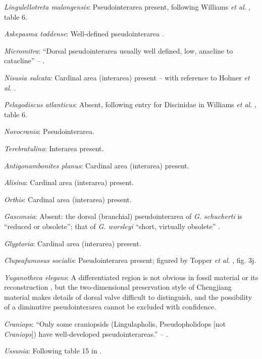 \documentclass[openany]{book}
\theoremstyle{definition}
\theoremstyle{definition}
\theoremstyle{definition}
\theoremstyle{remark}
\begin{document}
\emph{Lingulellotreta malongensis}: Pseudointerarea present, following
Williams \emph{et al}.
\citeyearpar{Williams2000BrachiopodaLinguliformea}, table 6.

\emph{Askepasma toddense}: Well-defined pseudointerarea
\citep[p153]{Williams2000BrachiopodaLinguliformea}.

\emph{Micromitra}: ``Dorsal pseudointerarea usually well defined, low,
anacline to catacline'' -- \citet{Williams2000BrachiopodaLinguliformea}.

\emph{Nisusia sulcata}: Cardinal area (interarea) present -- with
reference to Holmer \emph{et al}.
\citeyearpar{Holmer2018Evolutionarysignificance}.

\emph{Pelagodiscus atlanticus}: Absent, following entry for Discinidae
in Williams \emph{et al}.
\citeyearpar{Williams2000BrachiopodaLinguliformea}, table 6.

\emph{Novocrania}: Pseudointerarea.

\emph{Terebratulina}: Interarea present.

\emph{Antigonambonites planus}: Cardinal area (interarea) present.

\emph{Alisina}: Cardinal area (interarea) present.

\emph{Orthis}: Cardinal area (interarea) present.

\emph{Gasconsia}: Absent: the dorsal (branchial) pseudointerarea of
\emph{G. schucherti} is ``reduced or obsolete''; that of \emph{G.
worsleyi} ``short, virtually obsolete'' \citep{Hanken1985Thetaxonomy}.

\emph{Glyptoria}: Cardinal area (interarea) present.

\emph{Clupeafumosus socialis}: Pseudointerarea present; figured by
Topper \emph{et al}. \citeyearpar{Topper2013Reappraisalof}, fig. 3j.

\emph{Yuganotheca elegans}: A differentiated region is not obvious in
fossil material or its reconstruction \citep{Zhang2014Anearly}, but the
two-dimensional preservation style of Chengjiang material makes details
of dorsal valve difficult to distinguish, and the possibility of a
diminutive pseudointerarea cannot be excluded with confidence.

\emph{Craniops}: ``Only some craniopsids (Lingulapholis, Pseudopholidops
{[}not \emph{Craniops}{]}) have well-developed pseudointerareas.'' --
\citet{Williams2000BrachiopodaLinguliformea}.

\emph{Ussunia}: Following table 15 in
\citet{Williams2000BrachiopodaLinguliformea}.
\end{document}

